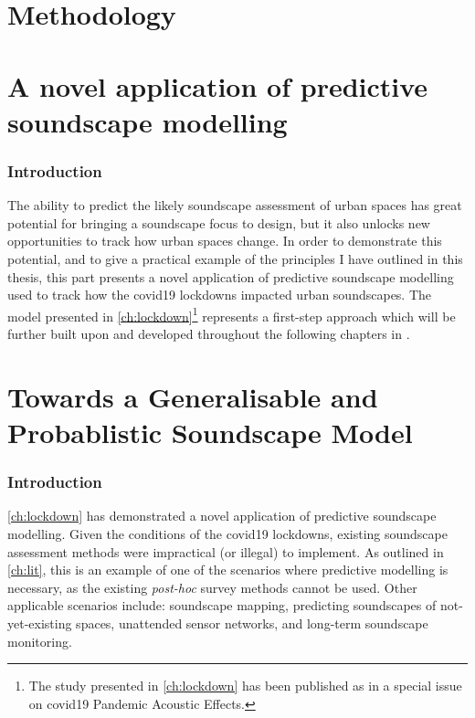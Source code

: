 \documentclass[twoside,fontsize=12pt,titlepage,chapterprefix=true
]{scrbook}
\begin{document}
\mainmatter




\part{Methodology}



\part{A novel application of predictive soundscape modelling}
\section*{Introduction}

The ability to predict the likely soundscape assessment of urban spaces has great potential for bringing a soundscape focus to design, but it also unlocks new opportunities to track how urban spaces change. In order to demonstrate this potential, and to give a practical example of the principles I have outlined in this thesis, this part presents a novel application of predictive soundscape modelling used to track how the \gls{covid19} lockdowns impacted urban soundscapes. The model presented in \cref{ch:lockdown}\footnote{The study presented in \cref{ch:lockdown} has been published as \citep{Mitchell2021Investigating} in a special issue on \gls{covid19} Pandemic Acoustic Effects. } represents a first-step approach which will be further built upon and developed throughout the following chapters in \cref{part:generalModel}.



\part{Towards a Generalisable and Probablistic Soundscape Model}
\label{part:generalModel}
\section*{Introduction}
\cref{ch:lockdown} has demonstrated a novel application of predictive soundscape modelling. Given the conditions of the \gls{covid19} lockdowns, existing soundscape assessment methods were impractical (or illegal) to implement. As outlined in \cref{ch:lit}, this is an example of one of the scenarios where predictive modelling is necessary, as the existing \emph{post-hoc} survey methods cannot be used. Other applicable scenarios include: soundscape mapping, predicting soundscapes of not-yet-existing spaces, unattended sensor networks, and long-term soundscape monitoring. 
\end{document}

